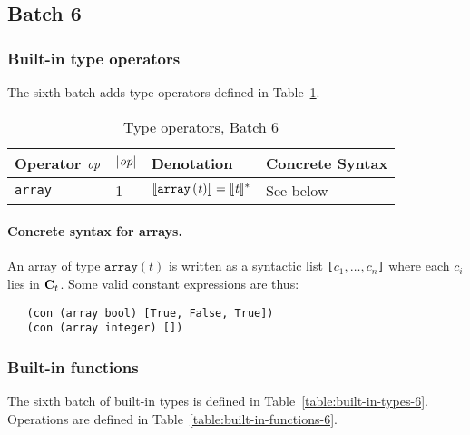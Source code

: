 \renewcommand{\note}[1]{
  \bigskip
  \refstepcounter{notenumberF}
  \noindent\textbf{Note \thenotenumberF. #1}
}
\newpage
\subsection{Batch 6}
\label{sec:default-builtins-6}

\subsubsection{Built-in type operators}
\label{sec:built-in-type-operatos-6}
The sixth batch adds type operators defined in Table~\ref{table:built-in-type-operators-6}. 

\begin{table}[H]
  \centering
    \begin{tabular}{|l|p{14mm}|l|l|}
        \hline
        Operator $\textit{op}$ & $\left|\textit{op}\right|$  & Denotation & Concrete Syntax\\
        \hline
        \texttt{array} 
          & 1 
          & $\llbracket\mathit{\mathtt{array}\,\mathtt{(}t\mathtt{)}}\rrbracket = \llbracket\mathit{t}\rrbracket^*$ 
          & See below\\
        \hline
        \end{tabular}
   \caption{Type operators, Batch 6}
    \label{table:built-in-type-operators-6}
\end{table}

\paragraph{Concrete syntax for arrays.}
An array of type $\texttt{array}(t)$ is written as a syntactic list
\texttt{[$c_1, \ldots, c_n$]} where each $c_i$ lies in $\mathbf{C}_t$.
Some valid constant expressions are thus:
\begin{verbatim}
   (con (array bool) [True, False, True])
   (con (array integer) [])
\end{verbatim}

\subsubsection{Built-in functions}
\label{sec:built-in-functions-6}
The sixth batch of built-in types is defined in Table~\ref{table:built-in-types-6}.
Operations are defined in Table~\ref{table:built-in-functions-6}.


